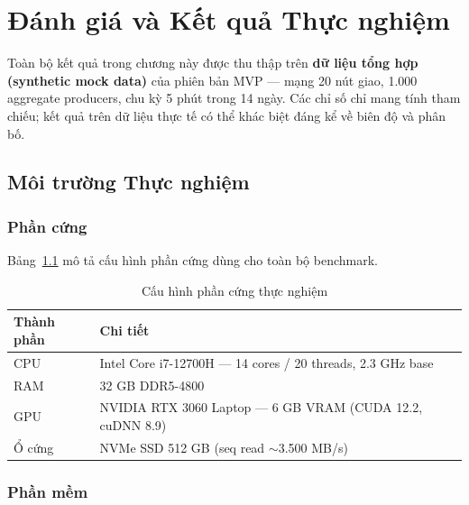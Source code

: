 \chapter{Đánh giá và Kết quả Thực nghiệm}

\begin{tcolorbox}[warnbox]
Toàn bộ kết quả trong chương này được thu thập trên \textbf{dữ liệu tổng hợp (synthetic mock data)} của phiên bản MVP --- mạng 20 nút giao, 1.000 aggregate producers, chu kỳ 5 phút trong 14 ngày. Các chỉ số chỉ mang tính tham chiếu; kết quả trên dữ liệu thực tế có thể khác biệt đáng kể về biên độ và phân bố.
\end{tcolorbox}

\section{Môi trường Thực nghiệm}

\subsection{Phần cứng}

Bảng~\ref{tab:hw_env} mô tả cấu hình phần cứng dùng cho toàn bộ benchmark.

\begin{table}[H]
\centering
\caption{Cấu hình phần cứng thực nghiệm}
\label{tab:hw_env}
\renewcommand{\arraystretch}{1.4}
\begin{tabular}{p{3.5cm} p{9cm}}
\toprule
\textbf{Thành phần} & \textbf{Chi tiết} \\
\midrule
CPU & Intel Core i7-12700H --- 14 cores / 20 threads, 2.3 GHz base \\
\rowcolor{rowgray}
RAM & 32 GB DDR5-4800 \\
GPU & NVIDIA RTX 3060 Laptop --- 6 GB VRAM (CUDA 12.2, cuDNN 8.9) \\
\rowcolor{rowgray}
Ổ cứng & NVMe SSD 512 GB (seq read $\sim$3.500 MB/s) \\
\bottomrule
\end{tabular}
\end{table}

\subsection{Phần mềm}


